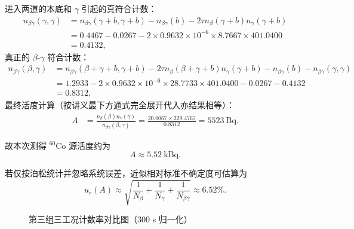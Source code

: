\documentclass[12pt,a4paper]{article}
\begin{document}
进入两道的本底和 $\gamma$ 引起的真符合计数：
\begin{align}
    n_{\beta\gamma}(\gamma,\gamma)
    &=n_{\beta\gamma}(\gamma+b, \gamma+b)-n_{\beta\gamma}(b)-2\tau n_{\beta}(\gamma+b)n_{\gamma}(\gamma+b) \\
    &=0.4467-0.0267-2\times 0.9632\times10^{-6}\times 8.7667\times 401.0400 \\
    &=0.4132,
\end{align}
真正的 $\beta$-$\gamma$ 符合计数：
\begin{align}
    n_{\beta\gamma}(\beta,\gamma)
    &=n_{\beta\gamma}(\beta+\gamma+b, \gamma+b)-2\tau n_{\beta}(\beta+\gamma+b)n_{\gamma}(\gamma+b)-n_{\beta\gamma}(b)-n_{\beta\gamma}(\gamma,\gamma) \\
    &=1.2933-2\times 0.9632\times10^{-6}\times 28.7733\times 401.0400-0.0267-0.4132 \\
    &=0.8312,
\end{align}
最终活度计算（按讲义最下方通式完全展开代入亦结果相等）：
\begin{align}
    A
    &=\frac{n_{\beta}(\beta)n_{\gamma}(\gamma)}{n_{\beta\gamma}(\beta,\gamma)}
    =\frac{20.0067\times229.4767}{0.8312}
    =\SI{5523}{\becquerel}.
\end{align}

故本次测得 $^{60}\mathrm{Co}$ 源活度约为
\begin{equation}
    A\approx \SI{5.52}{\kilo\becquerel}.
\end{equation}

若仅按泊松统计并忽略系统误差，近似相对标准不确定度可估算为
\begin{equation}
    u_r(A)\approx\sqrt{\frac{1}{N_{\beta}}+\frac{1}{N_{\gamma}}+\frac{1}{N_{\beta\gamma}}}\approx 6.52\%.
\end{equation}

\begin{figure}[htbp]
\centering
{}
\caption{第三组三工况计数率对比图（300 s 归一化）}\label{fig:group3-bars}
\end{figure}
\end{document}
